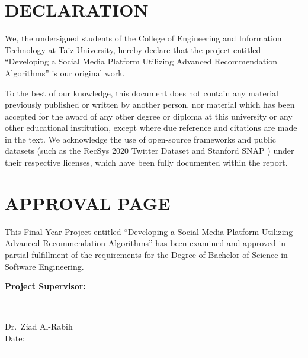 \documentclass[12pt,a4paper]{report}
\begin{document}
\titlespacing*{\chapter}{0pt}{-30pt}{20pt}



\chapter*{DECLARATION}

We, the undersigned students of the College of Engineering and Information Technology at Taiz University, hereby declare that the project entitled ``Developing a Social Media Platform Utilizing Advanced Recommendation Algorithms'' is our original work.

To the best of our knowledge, this document does not contain any material previously published or written by another person, nor material which has been accepted for the award of any other degree or diploma at this university or any other educational institution, except where due reference and citations are made in the text. We acknowledge the use of open-source frameworks and public datasets (such as the RecSys 2020 Twitter Dataset \cite{recsys2020} and Stanford SNAP \cite{snap2014}) under their respective licenses, which have been fully documented within the report.

\chapter*{APPROVAL PAGE}

This Final Year Project entitled ``Developing a Social Media Platform Utilizing Advanced Recommendation Algorithms'' has been examined and approved in partial fulfillment of the requirements for the Degree of Bachelor of Science in Software Engineering.

\vspace{1.5cm}

\noindent\textbf{Project Supervisor:}\\
\noindent\rule{8cm}{0.4pt}\\
Dr.\ Ziad Al-Rabih\\
Date: \rule{4cm}{0.4pt}
\end{document}
